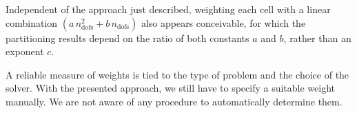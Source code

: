 Independent of the approach just described, weighting each cell with a linear combination $(a \, n_\text{dofs}^2 + b \, n_\text{dofs})$ also appears conceivable, for which the partitioning results depend on the ratio of both constants $a$ and $b$, rather than an exponent $c$.


\enlargethispage{\baselineskip} A reliable measure of weights is tied to the type of problem and the choice of the solver. With the presented approach, we still have to specify a suitable weight manually. We are not aware of any procedure to automatically determine them.
